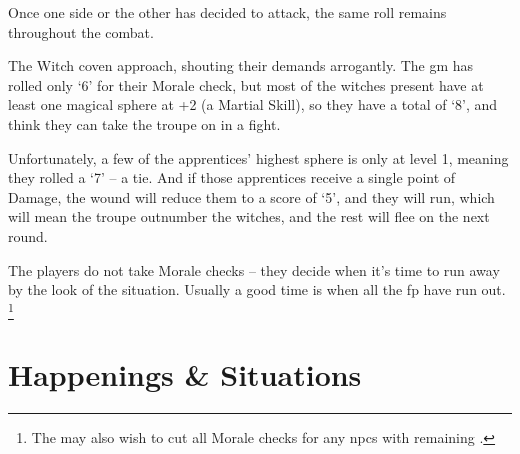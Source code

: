 \begin{multicols}{2}
Once one side or the other has decided to attack, the same roll remains throughout the combat.

\begin{exampletext}
  The Witch coven approach, shouting their demands arrogantly.
  The \gls{gm} has rolled only `6' for their Morale check, but most of the witches present have at least one magical sphere at +2 (a Martial Skill), so they have a total of `8', and think they can take the troupe on in a fight.

  Unfortunately, a few of the apprentices' highest sphere is only at level 1, meaning they rolled a `7' -- a tie.
  And if those apprentices receive a single point of Damage, the wound will reduce them to a score of `5', and they will run, which will mean the troupe outnumber the witches, and the rest will flee on the next round.
\end{exampletext}

The players do not take Morale checks -- they decide when it's time to run away by the look of the situation.
Usually a good time is when all the \gls{fp} have run out.
\footnote{The  may also wish to cut all Morale checks for any \glspl{npc} with remaining .}

\end{multicols}

\section{Happenings \& Situations}

\encTownEvents

